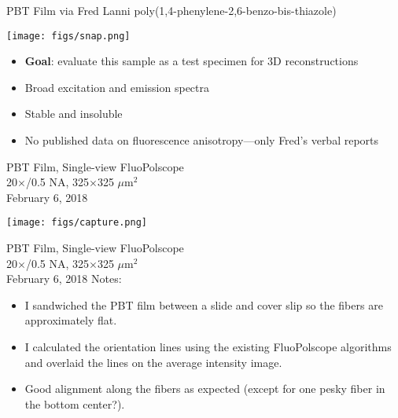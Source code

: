 \documentclass[presentation]{beamer}
\begin{document}
\begin{frame}{PBT Film via Fred Lanni}
  poly(1,4-phenylene-2,6-benzo-bis-thiazole)
   \begin{center}
     \texttt{[image: figs/snap.png]}
   \end{center}
   \begin{itemize}
   \item \textbf{Goal}: evaluate this sample as a test specimen for 3D reconstructions
   \item Broad excitation and emission spectra
   \item Stable and insoluble
   \item No published data on fluorescence anisotropy---only Fred's verbal reports
   \end{itemize}
\end{frame}

\begin{frame}{PBT Film, Single-view FluoPolscope\\20$\times$/0.5 NA, 325$\times$325 $\mu$m${}^2$ \\February 6, 2018}
   \begin{center}
     \texttt{[image: figs/capture.png]}
   \end{center}
\end{frame}

\begin{frame}{PBT Film, Single-view FluoPolscope\\20$\times$/0.5 NA, 325$\times$325 $\mu$m${}^2$ \\February 6, 2018}
  Notes:
  \begin{itemize}
  \item I sandwiched the PBT film between a slide and cover slip so the fibers are 
    approximately flat.
  \item I calculated the orientation lines using the existing FluoPolscope
    algorithms and overlaid the lines on the average intensity image.
  \item Good alignment along the fibers as expected (except for one pesky fiber in
    the bottom center?).
  \end{itemize}
\end{frame}
\end{document}

